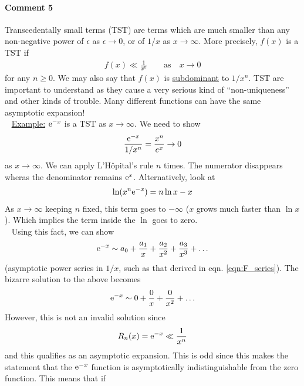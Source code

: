 \paragraph{Comment 5} Transcedentally small terms (TST) are terms which are much smaller than any non-negative power of $\epsilon$ as $\epsilon \rightarrow 0$, or of $1/x$ as $x\rightarrow \infty$. More precisely, $f(x)$ is a TST if 
\begin{gather*}
	f(x) \ll \frac{1}{x^n} \qquad \text{as} \quad x \rightarrow 0
\end{gather*}
for any $n \geq 0$. We may also say that $f(x)$ is \underline{subdominant} to $1/x^n$. TST are important to understand as they cause a very serious kind of ``non-uniqueness'' and other kinds of trouble. Many different functions can have the same asymptotic expansion! \\
\ \newline
\underline{Example:} $\mathrm{e}^{-x}$ is a TST as $x \rightarrow \infty$. We need to show
\begin{gather*}
	\frac{\mathrm{e}^{-x}}{1/x^n} = \frac{x^n}{e^x} \rightarrow 0
\end{gather*} 
as $x \rightarrow \infty$. We can apply L'H\^opital's rule $n$ times. The numerator disappears wheras the denominator remains $\mathrm{e}^x$. Alternatively, look at
\begin{gather*}
	\ln (x^n \mathrm{e}^{-x}) = n \ln x - x
\end{gather*}
As $x \rightarrow \infty$ keeping $n$ fixed, this term goes to $-\infty$ ($x$ grows much faster than $\ln x$). Which implies the term inside the $\ln$ goes to zero.\\
\ \newline
Using this fact, we can show
\begin{gather*}
	\mathrm{e}^{-x} \sim a_0 + \frac{a_1}{x} + \frac{a_2}{x^2} + \frac{a_3}{x^3} + \dots 
\end{gather*}
(asymptotic power series in $1/x$, such as that derived in eqn. \ref{eqn:F_series}). The bizarre solution to the above becomes
\begin{gather*}
	\mathrm{e}^{-x} \sim 0 + \frac{0}{x} + \frac{0}{x^2} + \dots 
\end{gather*}
However, this is not an invalid solution since
\begin{gather*}
	R_n(x) = \mathrm{e}^{-x} \ll \frac{1}{x^n}
\end{gather*}
and this qualifies as an asymptotic expansion. This is odd since this makes the statement that the $\mathrm{e}^{-x}$ function is asymptotically indistinguishable from the zero function. This means that if
